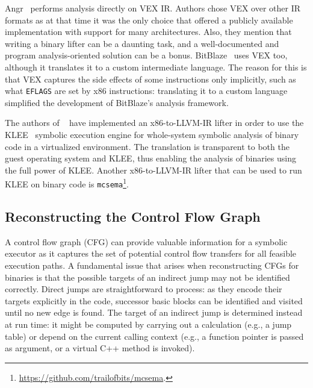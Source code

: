 {\sc Angr}~\cite{ANGR-SSP16} performs analysis directly on VEX IR. Authors chose VEX over other IR formats as at that time it was the only choice that offered a publicly available implementation with support for many architectures. Also, they mention that writing a binary lifter can be a daunting task, and a well-documented and program analysis-oriented solution can be a bonus. {\sc BitBlaze}~\cite{BITBLAZE-ICISS08} uses VEX too, although it translates it to a custom intermediate language. The reason for this is that VEX captures the side effects of some instructions only implicitly, such as what {\tt EFLAGS} are set by x86 instructions: translating it to a custom language simplified the development of {\sc BitBlaze}'s analysis framework.

The authors of {\sc \stwoe}~\cite{CKC-TOCS12} have implemented an x86-to-LLVM-IR lifter in order to use the {\sc KLEE}~\cite{KLEE-OSDI08} symbolic execution engine for whole-system symbolic analysis of binary code in a virtualized environment. The translation is transparent to both the guest operating system and KLEE, thus enabling the analysis of binaries using the full power of {\sc KLEE}. Another x86-to-LLVM-IR lifter that can be used to run {\sc KLEE} on binary code is {\tt mcsema}\footnote{\url{https://github.com/trailofbits/mcsema}.}.

\subsection{Reconstructing the Control Flow Graph}

A control flow graph (CFG) can provide valuable information for a symbolic executor as it captures the set of potential control flow transfers for all feasible execution paths. A fundamental issue that arises when reconstructing CFGs for binaries is that the possible targets of an indirect jump may not be identified correctly. Direct jumps are straightforward to process: as they encode their targets explicitly in the code, successor basic blocks can be identified and visited until no new edge is found. The target of an indirect jump is determined instead at run time: it might be computed by carrying out a calculation (e.g., a jump table) or depend on the current calling context (e.g., a function pointer is passed as argument, or a virtual C++ method is invoked). %

